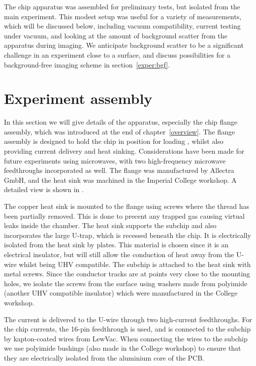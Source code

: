 The chip apparatus was assembled for preliminary tests, but isolated from the 
main \CaF{} experiment. This modest setup was useful for a variety of
measurements, which will be discussed below, including vacuum compatibility,
current testing under vacuum, and looking at the amount of background scatter
from the apparatus during imaging. We anticipate background scatter to be a
significant challenge in an experiment close to a surface, and discuss
possibilities for a background-free imaging scheme in
section~\ref{exper:bgf}.

\section{Experiment assembly}

In this section we will give details of the apparatus, especially the chip
flange assembly, which was introduced at the end of chapter~\ref{overview}. The
flange assembly is designed to hold the chip in position for loading \CaF{},
whilst also providing current delivery and heat sinking. Considerations have
been made for future experiments using microwaves, with two high-frequency
microwave feedthroughs incorporated as well. The flange was manufactured by
Allectra GmbH, and the heat sink was machined in the Imperial College workshop.
A detailed view is shown in .

The copper heat sink is mounted to the flange using screws where the thread has
been partially removed. This is done to precent any trapped gas causing virtual
leaks inside the chamber. The heat sink supports the subchip and also
incorporates the large U-trap, which is recessed beneath the chip. It is
electrically isolated from the heat sink by \AlN{} plates. This material is
chosen since it is an electrical insulator, but will still allow the conduction
of heat away from the U-wire whilst being UHV compatible. The subchip is
attached to the heat sink with metal screws. Since the conductor tracks are at
points very close to the mounting holes, we isolate the screws from the surface
using washers made from polyimide (another UHV compatible insulator) which were
manufactured in the College workshop.

The current is delivered to the U-wire through two high-current feedthroughs.
For the chip currents, the 16-pin feedthrough is used, and is connected to the
subchip by kapton-coated wires from LewVac. When connecting the wires to the
subchip we use polyimide bushings (also made in the College workshop) to ensure
that they are electrically isolated from the aluminium core of the PCB.

